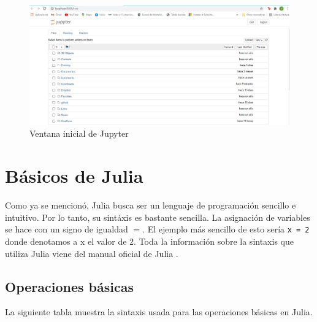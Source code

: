 \begin{figure}[h]
\begin{center}
\includegraphics[scale=0.45]{Imagenes/inicio_jupyther.JPG}
 \caption{Ventana inicial de Jupyter}
  \label{main_atom}
\end{center}
\end{figure}



\section{Básicos de Julia}
Como ya se mencionó, Julia busca ser un lenguaje de programación sencillo e intuitivo. Por lo tanto, su sintáxis es bastante sencilla. La asignación de variables se hace con un signo de igualdad $=$. El ejemplo más sencillo de esto sería \texttt{x = 2} donde denotamos a x el valor de 2. Toda la información sobre la sintaxis que utiliza Julia viene del manual oficial de Julia \citep{Julia_manual}.

\subsection{Operaciones básicas}
La siguiente tabla muestra la sintaxis usada para las operaciones básicas en Julia. 

